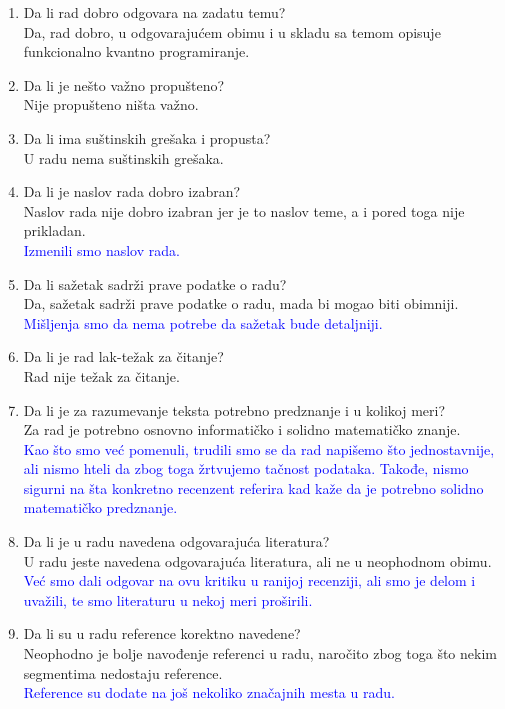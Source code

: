\documentclass[a4paper]{report}
\newcommand{\odgovor}[1]{\textcolor{blue}{#1}}
\begin{document}
\begin{enumerate}
\item Da li rad dobro odgovara na zadatu temu?\\
Da, rad dobro, u odgovarajućem obimu i u skladu sa temom opisuje funkcionalno kvantno programiranje.
\item Da li je nešto važno propušteno?\\
Nije propušteno ništa važno.
\item Da li ima suštinskih grešaka i propusta?\\
U radu nema suštinskih grešaka.
\item Da li je naslov rada dobro izabran?\\
Naslov rada nije dobro izabran jer je to naslov teme, a i pored toga nije prikladan.\\
\odgovor {Izmenili smo naslov rada.} 
\item Da li sažetak sadrži prave podatke o radu?\\
Da, sažetak sadrži prave podatke o radu, mada bi mogao biti obimniji.\\
\odgovor {Mišljenja smo da nema potrebe da sažetak bude detaljniji. }
\item Da li je rad lak-težak za čitanje?\\
Rad nije težak za čitanje.
\item Da li je za razumevanje teksta potrebno predznanje i u kolikoj meri?\\
Za rad je potrebno osnovno informatičko i solidno matematičko znanje.\\
\odgovor {Kao što smo već pomenuli, trudili smo se da rad napišemo što jednostavnije, ali nismo hteli da zbog toga žrtvujemo tačnost podataka. Takođe, nismo sigurni na šta konkretno recenzent referira kad kaže da je potrebno solidno matematičko predznanje.}
\item Da li je u radu navedena odgovarajuća literatura?\\
U radu jeste navedena odgovarajuća literatura, ali ne u neophodnom obimu.\\
\odgovor {Već smo dali odgovar na ovu kritiku u ranijoj recenziji, ali smo je delom i uvažili, te smo literaturu u nekoj meri proširili.}
\item Da li su u radu reference korektno navedene?\\
Neophodno je bolje navođenje referenci u radu, naročito zbog toga što nekim segmentima nedostaju reference.\\
\odgovor {Reference su dodate na još nekoliko značajnih mesta u radu.}


\end{enumerate}
\end{document}
